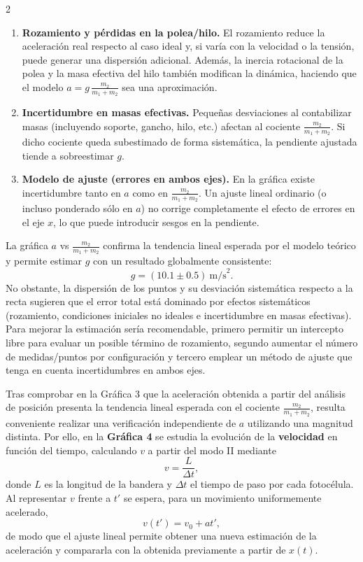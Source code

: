 \documentclass[12pt,a4paper]{article}
\begin{document}
\begin{multicols}{2}
\begin{enumerate}
\item \textbf{Rozamiento y pérdidas en la polea/hilo.}
El rozamiento reduce la aceleración real respecto al caso ideal y, si varía con la velocidad o la tensión, puede generar una dispersión adicional. Además, la inercia rotacional de la polea y la masa efectiva del hilo también modifican la dinámica, haciendo que el modelo $a=g\,\frac{m_2}{m_1+m_2}$ sea una aproximación.

\item \textbf{Incertidumbre en masas efectivas.}
Pequeñas desviaciones al contabilizar masas (incluyendo soporte, gancho, hilo, etc.) afectan al cociente $\frac{m_2}{m_1+m_2}$. Si dicho cociente queda subestimado de forma sistemática, la pendiente ajustada tiende a sobreestimar $g$.

\item \textbf{Modelo de ajuste (errores en ambos ejes).}
En la gráfica existe incertidumbre tanto en $a$ como en $\frac{m_2}{m_1+m_2}$. Un ajuste lineal ordinario (o incluso ponderado sólo en $a$) no corrige completamente el efecto de errores en el eje $x$, lo que puede introducir sesgos en la pendiente.
\end{enumerate}

La gráfica $a$ vs $\frac{m_2}{m_1+m_2}$ confirma la tendencia lineal esperada por el modelo teórico y permite estimar $g$ con un resultado globalmente consistente:
\[
g = (10.1 \pm 0.5)\ \text{m/s}^2.
\]
No obstante, la dispersión de los puntos y su desviación sistemática respecto a la recta sugieren que el error total está dominado por efectos sistemáticos (rozamiento, condiciones iniciales no ideales e incertidumbre en masas efectivas). Para mejorar la estimación sería recomendable, primero permitir un intercepto libre para evaluar un posible término de rozamiento, segundo aumentar el número de medidas/puntos por configuración y tercero emplear un método de ajuste que tenga en cuenta incertidumbres en ambos ejes.

Tras comprobar en la Gráfica 3 que la aceleración obtenida a partir del análisis de posición presenta la tendencia lineal esperada con el cociente $\frac{m_2}{m_1+m_2}$, resulta conveniente realizar una verificación independiente de $a$ utilizando una magnitud distinta. Por ello, en la \textbf{Gráfica 4} se estudia la evolución de la \textbf{velocidad} en función del tiempo, calculando $v$ a partir del modo II mediante
\begin{equation}
v = \frac{L}{\Delta t},
\end{equation}
donde $L$ es la longitud de la bandera y $\Delta t$ el tiempo de paso por cada fotocélula. Al representar $v$ frente a $t'$ se espera, para un movimiento uniformemente acelerado,
\begin{equation}
v(t') = v_0 + a t',
\end{equation}
de modo que el ajuste lineal permite obtener una nueva estimación de la aceleración y compararla con la obtenida previamente a partir de $x(t)$.


\end{multicols}
\end{document}
